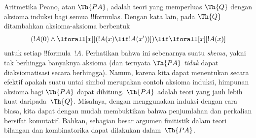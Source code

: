 \documentclass[../../../include/open-logic-section]{subfiles}
\begin{document}


Aritmetika Peano, atau $\Th{PA}$, adalah teori yang memperluas $\Th{Q}$
dengan aksioma induksi bagi semua !!{formula}s. Dengan kata lain, pada
$\Th{Q}$ ditambahkan aksioma-aksioma berbentuk
\[
(!A(0) \land \lforall[x][(!A(x) \lif !A(x'))]) \lif \lforall[x][!A(x)]
\]
untuk setiap !!{formula}~$!A$. Perhatikan bahwa ini sebenarnya suatu
\emph{skema}, yakni tak berhingga banyaknya aksioma (dan ternyata $\Th{PA}$
{\em tidak} dapat diaksiomatisasi secara berhingga). Namun, karena kita
dapat menentukan secara efektif apakah suatu untai simbol merupakan contoh
aksioma induksi, himpunan aksioma bagi $\Th{PA}$ dapat dihitung. $\Th{PA}$
adalah teori yang jauh lebih kuat daripada~$\Th{Q}$. Misalnya, dengan
menggunakan induksi dengan cara biasa, kita dapat dengan mudah membuktikan
bahwa penjumlahan dan perkalian bersifat komutatif. Bahkan, sebagian besar
argumen finitistik dalam teori bilangan dan kombinatorika dapat dilakukan
dalam~$\Th{PA}$.
\end{document}
